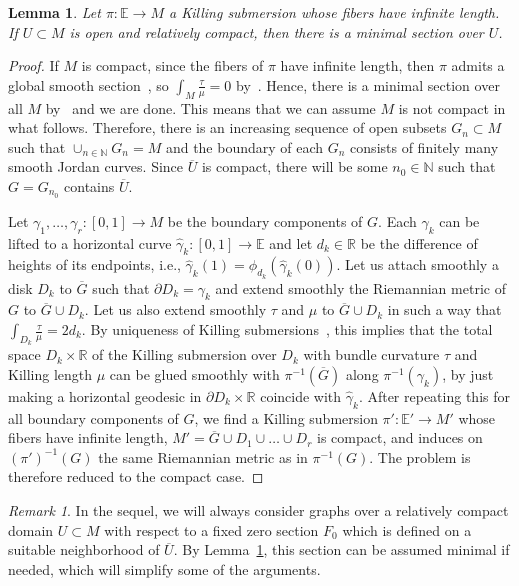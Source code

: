 \documentclass[a4paper,10pt,reqno]{amsart}
\newcommand{\N}{\mathbb{N}}
\newcommand{\R}{\mathbb{R}}
\newcommand{\E}{\mathbb{E}}
\newtheorem{lemma}[theorem]{Lemma}
\theoremstyle{definition}
\theoremstyle{remark}
\newtheorem{remark}[theorem]{Remark}
\numberwithin{equation}{section}
\begin{document}
\begin{lemma}\label{lemma:minimal-sections}
Let $\pi:\E\to M$ a Killing submersion whose fibers have infinite length. If $U\subset M$ is open and relatively compact, then there is a minimal section over $U$.
\end{lemma}
	
\begin{proof}
If $M$ is compact, since the fibers of $\pi$ have infinite length, then $\pi$ admits a global smooth section~\cite[Thm.~12.2]{Steenrod}, so $\int_M\frac{\tau}{\mu}=0$ by~\cite[Prop.~3.3]{LerMan}. Hence, there is a minimal section over all $M$ by~\cite[Thm.~3.6]{LerMan} and we are done. This means that we can assume $M$ is not compact in what follows. Therefore, there is an increasing sequence of open subsets $G_n\subset M$ such that $\cup_{n\in\N}G_n=M$ and the boundary of each $G_n$ consists of finitely many smooth Jordan curves. Since $\overline U$ is compact, there will be some $n_0\in\N$ such that $G=G_{n_0}$ contains $\overline U$. 

Let $\gamma_1,\ldots,\gamma_r:[0,1]\to M$ be the boundary components of $G$. Each $\gamma_k$ can be lifted to a horizontal curve $\widehat\gamma_k:[0,1]\to\E$ and let $d_k\in\R$ be the difference of heights of its endpoints, i.e., $\widehat\gamma_k(1)=\phi_{d_k}(\widehat\gamma_k(0))$. Let us attach smoothly a disk $D_k$ to $\overline G$ such that $\partial D_k=\gamma_k$ and extend smoothly the Riemannian metric of $G$ to $\overline G\cup D_k$. Let us also extend smoothly $\tau$ and $\mu$ to $\overline G\cup D_k$ in such a way that $\int_{D_k}\frac{\tau}{\mu}=2d_k$. By uniqueness of Killing submersions~\cite{LerMan}, this implies that the total space $D_k\times\R$ of the Killing submersion over $D_k$ with bundle curvature $\tau$ and Killing length $\mu$ can be glued smoothly with $\pi^{-1}(\overline G)$ along $\pi^{-1}(\gamma_k)$, by just making a horizontal geodesic in $\partial D_k\times\R$ coincide with $\widehat\gamma_k$. After repeating this for all boundary components of $G$, we find a Killing submersion $\pi':\E'\to M'$ whose fibers have infinite length, $M'=\overline G\cup D_1\cup\ldots\cup D_r$ is compact, and induces on $(\pi')^{-1}(G)$ the same Riemannian metric as in $\pi^{-1}(G)$. The problem is therefore reduced to the compact case.
\end{proof}

\begin{remark}
In the sequel, we will always consider graphs over a relatively compact domain $U\subset M$ with respect to a fixed zero section $F_0$ which is defined on a suitable neighborhood of $\overline U$. By Lemma~\ref{lemma:minimal-sections}, this section can be assumed minimal if needed, which will simplify some of the arguments.
\end{remark}
\end{document}

